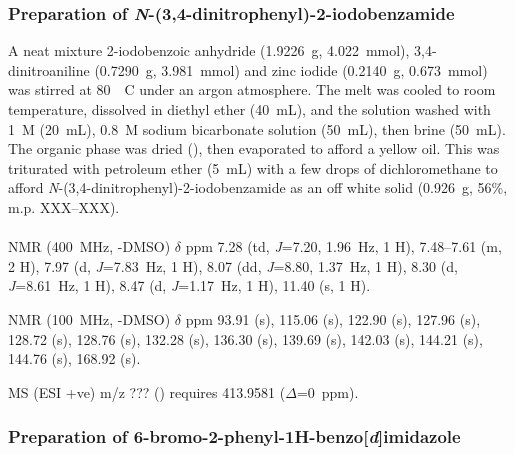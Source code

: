 \begin{refsection}
\subsubsection{Preparation of \emph{N}-(3,4-dinitrophenyl)-2-iodobenzamide }
A neat mixture 2-iodobenzoic anhydride  (1.9226~g, 4.022~mmol), 3,4-dinitroaniline (0.7290~g, 3.981~mmol) and zinc iodide (0.2140~g, 0.673~mmol) was stirred at 80~\degree~C under an argon atmosphere.
The melt was cooled to room temperature, dissolved in diethyl ether (40~mL), and the solution washed with 1~\textsc{M}  (20~mL), 0.8~\textsc{M} sodium bicarbonate solution (50~mL), then brine (50~mL).
The organic phase was dried (), then evaporated to afford a yellow oil.
This was triturated with petroleum ether (5~mL) with a few drops of dichloromethane to afford \emph{N}-(3,4-dinitrophenyl)-2-iodobenzamide  as an off white solid (0.926~g, 56\%, m.p. XXX--XXX).\autocite{Shivani2007}

\footnotesize\paragraph{}

 NMR (400~MHz, -DMSO) $\delta$ ppm
7.28 (td, \emph{J}=7.20, 1.96~Hz, 1 H),
7.48--7.61 (m, 2 H),
7.97 (d, \emph{J}=7.83~Hz, 1 H),
8.07 (dd, \emph{J}=8.80, 1.37~Hz, 1 H),
8.30 (d, \emph{J}=8.61~Hz, 1 H),
8.47 (d, \emph{J}=1.17~Hz, 1 H),
11.40 (s, 1 H).

 NMR (100~MHz, -DMSO) $\delta$ ppm
93.91 (s),
115.06 (s),
122.90 (s),
127.96 (s),
128.72 (s),
128.76 (s),
132.28 (s),
136.30 (s),
139.69 (s),
142.03 (s),
144.21 (s),
144.76 (s),
168.92 (s).

MS (ESI +ve) m/z ??? ()  requires 413.9581 ($\Delta$=0~ppm).

\normalsize

\subsubsection{Preparation of 6-bromo-2-phenyl-1\textbf{H}-benzo[\emph{d}]imidazole}

\printbibliography[heading=subbibliography]
\end{refsection}
